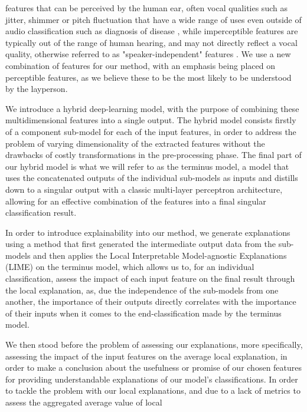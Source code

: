 \documentclass{article}
\begin{document}
	features that can be perceived by the human ear, often vocal qualities such as jitter, shimmer
	or pitch fluctuation that have a wide range of uses even outside of audio classification such
	as diagnosis of disease \cite{chaiwongyen_deepfake-speech_2023}, while imperceptible features
	are typically out of the range of human hearing, and may not directly reflect a vocal quality,
	otherwise referred to as "speaker-independent" features \cite{liu_hidden--wave_2023}. We use a
	new combination of features for our method, with an emphasis being placed on perceptible
	features, as we believe these to be the most likely to be understood by the layperson.
	\par
	We introduce a hybrid deep-learning model, with the purpose of combining these
	multidimensional features into a single output. The hybrid model consists firstly of a
	component sub-model for each of the input features, in order to address the problem of varying
	dimensionality of the extracted features without the drawbacks of costly transformations in
	the pre-processing phase. The final part of our hybrid model is what we will refer to as the
	terminus model, a model that uses the concatenated outputs of the individual sub-models as
	inputs and distills down to a singular output with a classic multi-layer perceptron
	architecture, allowing for an effective combination of the features into a final singular
	classification result.
	\par
	In order to introduce explainability into our method, we generate explanations using a method
	that first generated the intermediate output data from the sub-models and then applies the
	Local Interpretable Model-agnostic Explanations (LIME) \cite{ribeiro_why_2016} on the terminus
	model, which allows us to, for an individual classification, assess the impact of each input
	feature on the final result through the local explanation, as, due the independence of the
	sub-models from one another, the importance of their outputs directly correlates with the
	importance of their inputs when it comes to the end-classification made by the terminus model.
	\par
	We then stood before the problem of assessing our explanations, more specifically, assessing
	the impact of the input features on the average local explanation, in order to make a
	conclusion about the usefulness or promise of our chosen features for providing understandable
	explanations of our model's classifications. In order to tackle the problem with our local
	explanations, and due to a lack of metrics to assess the aggregated average value of local
\end{document}
